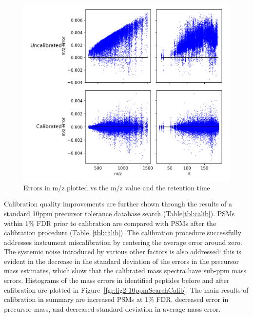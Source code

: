 \documentclass[journal=jprobs,manuscript=article]{achemso}
\begin{document}
\begin{figure}[H]
 \includegraphics{fig1-calibErrors.png}
 \caption{Errors in m/z plotted vs the m/z value and the retention time}
 \label{fgr:fig1-calibErrors}
\end{figure}

Calibration quality improvements are further shown through the results of a standard 10ppm precursor tolerance database search (Table\ref{tbl:calib}).
PSMs within 1\% FDR prior to calibration are compared with PSMs after the calibration procedure (Table~\ref{tbl:calib}).
The calibration procedure successfully addresses instrument miscalibration by centering the average error around zero.
The systemic noise introduced by various other factors is also addressed: this is evident in the decrease in the standard deviation of the errors in the precursor mass estimates, which show that the calibrated mass spectra have sub-ppm mass errors.
Histograms of the mass errors in identified peptides before and after calibration are plotted in Figure~\ref{fgr:fig2-10ppmSearchCalib}.
The main results of calibration in summary are increased PSMs at 1\% FDR, decreased error in precursor mass, and decreased standard deviation in average mass error. 
\end{document}
